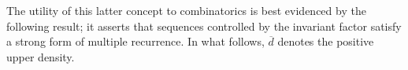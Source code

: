 \documentclass[11pt]{amsart}
\newtheorem{proposition}[lemma]{Proposition}
\theoremstyle{definition}
\DeclareMathOperator*{\E}{\mathbb{E}}
\newcommand{\N}{{\mathbb N}}
\newcommand{\R}{{\mathbb R}}
\newcommand{\Z}{{\mathbb Z}}
\newcommand{\CX}{{\mathcal X}}
\newcommand{\bv}{{\mathbf{v}}}
\newcommand{\veps}{\varepsilon}
\newcommand{\1}{{\mathbf{1}}}
\newcommand{\floor}[1]{{\left \lfloor #1 \right \rfloor}}
\newcommand{\BK}[1]{{\color{Apricot}{{#1}}}}
\begin{document}
The utility of this latter concept to combinatorics is best evidenced by the following result; it asserts that sequences controlled by the invariant factor satisfy a strong form of multiple recurrence. In what follows, $\overline{d}$ denotes the positive upper density.
\end{document}
